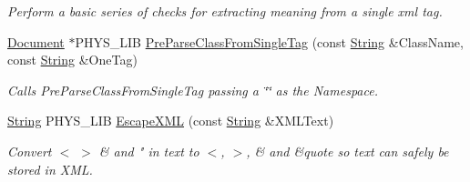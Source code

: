 \begin{DoxyCompactItemize}
\begin{DoxyCompactList}\small\item\em Perform a basic series of checks for extracting meaning from a single xml tag. \item\end{DoxyCompactList}\item 
\hyperlink{classphys_1_1xml_1_1Document}{Document} $\ast$PHYS\_\-LIB \hyperlink{namespacephys_1_1xml_ad6253962e86b5e7c149aef36662d17e1}{PreParseClassFromSingleTag} (const \hyperlink{namespacephys_1_1xml_a4d8ca7638328d16d303e5a4c849f4704}{String} \&ClassName, const \hyperlink{namespacephys_1_1xml_a4d8ca7638328d16d303e5a4c849f4704}{String} \&OneTag)
\begin{DoxyCompactList}\small\item\em Calls PreParseClassFromSingleTag passing a \char`\"{}\char`\"{} as the Namespace. \item\end{DoxyCompactList}\item 
\hyperlink{namespacephys_1_1xml_a4d8ca7638328d16d303e5a4c849f4704}{String} PHYS\_\-LIB \hyperlink{namespacephys_1_1xml_abdfe44958945865c471158d8c071f727}{EscapeXML} (const \hyperlink{namespacephys_1_1xml_a4d8ca7638328d16d303e5a4c849f4704}{String} \&XMLText)
\begin{DoxyCompactList}\small\item\em Convert $<$ $>$ \& and " in text to $<$, $>$, \& and \&quote so text can safely be stored in XML. \item\end{DoxyCompactList}\end{DoxyCompactItemize}
